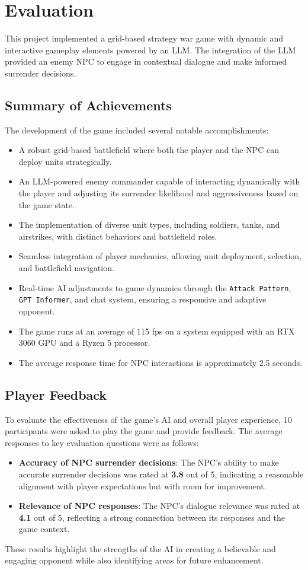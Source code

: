 \chapter{Evaluation}

This project implemented a grid-based strategy war game with dynamic and interactive gameplay elements powered by an LLM. The integration of the LLM provided an enemy NPC to engage in contextual dialogue and make informed surrender decisions.

\section{Summary of Achievements}
The development of the game included several notable accomplishments:
\begin{itemize}
    \item A robust grid-based battlefield where both the player and the NPC can deploy units strategically.
    \item An LLM-powered enemy commander capable of interacting dynamically with the player and adjusting its surrender likelihood and aggressiveness based on the game state.
    \item The implementation of diverse unit types, including soldiers, tanks, and airstrikes, with distinct behaviors and battlefield roles.
    \item Seamless integration of player mechanics, allowing unit deployment, selection, and battlefield navigation.
    \item Real-time AI adjustments to game dynamics through the \texttt{Attack Pattern}, \texttt{GPT Informer}, and chat system, ensuring a responsive and adaptive opponent.
    \item The game runs at an average of 115 fps on a system equipped with an RTX 3060 GPU and a Ryzen 5 processor.
    \item The average response time for NPC interactions is approximately 2.5 seconds.
\end{itemize}

\section{Player Feedback}
To evaluate the effectiveness of the game's AI and overall player experience, 10 participants were asked to play the game and provide feedback. The average responses to key evaluation questions were as follows:
\begin{itemize}
    \item \textbf{Accuracy of NPC surrender decisions}: The NPC's ability to make accurate surrender decisions was rated at \textbf{3.8} out of 5, indicating a reasonable alignment with player expectations but with room for improvement.
    \item \textbf{Relevance of NPC responses}: The NPC's dialogue relevance was rated at \textbf{4.1} out of 5, reflecting a strong connection between its responses and the game context.
\end{itemize}
These results highlight the strengths of the AI in creating a believable and engaging opponent while also identifying areas for future enhancement.

